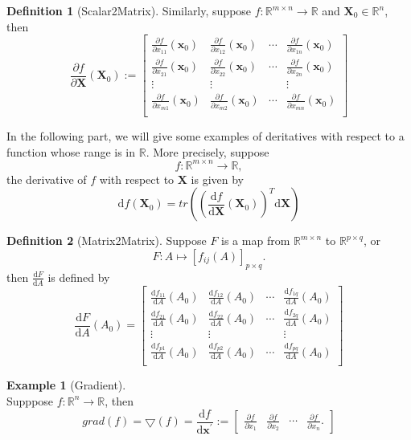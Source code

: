 \documentclass[12pt]{article}
\theoremstyle{definition}
\newtheorem{definition}{Definition}[section]
\newtheorem{example}{Example}[section]
\newcommand{\x}{\mathbf{x}}
\newcommand{\R}{\mathbb{R}}
\newcommand{\X}{\mathbf{X}}
\newcommand{\D}{\mathrm{d}}
\begin{document}
\begin{definition}[Scalar2Matrix]
Similarly, suppose $f:\R^{m \times n} \to \R$ and $\X_0 \in \R^n$, then 
$$
\frac{\partial f}{\partial \X}(\X_0) := \begin{bmatrix}
		\frac{\partial f}{\partial x_{11}}(\x_0) & 	\frac{\partial f}{\partial x_{12}}(\x_0) & \cdots &	\frac{\partial f}{\partial x_{1n}}(\x_0) \\
		\frac{\partial f}{\partial x_{21}}(\x_0) & 	\frac{\partial f}{\partial x_{22}}(\x_0) & \cdots &	\frac{\partial f}{\partial x_{2n}}(\x_0) \\
		\vdots & \vdots &&\vdots  \\
		\frac{\partial f}{\partial x_{m1}}(\x_0) & 	\frac{\partial f}{\partial x_{m2}}(\x_0) & \cdots &	\frac{\partial f}{\partial x_{mn}}(\x_0) \\
\end{bmatrix}
$$

\end{definition}





In the following part, we will give some examples of deritatives with respect to a function whose range is in $\R$. More precisely, suppose
$$
f : \R^{m \times n } \to \R,
$$
the derivative of $f$ with respect to $\X$ is given by
$$
\D f(\X_0)=tr((\frac{\D f}{\D \X}(\X_0))^T\D \X)
$$
\begin{definition}[Matrix2Matrix]
Suppose $F$ is a map from $\R^{m \times n}$ to $\R^{p \times q}$, or
$$
F: A \mapsto [f_{ij}(A)]_{p \times q}.
$$
then $\frac{\D F}{\D A}$ is defined by
$$
\frac{\D F}{\D A}(A_0) = \begin{bmatrix}
\frac{\D f_{11}}{\D A}(A_0) & \frac{\D f_{12}}{\D A}(A_0) & \cdots & \frac{\D f_{1q}}{\D A}(A_0) \\
\frac{\D f_{21}}{\D A}(A_0) & \frac{\D f_{22}}{\D A}(A_0) & \cdots & \frac{\D f_{2q}}{\D A}(A_0) \\
\vdots & \vdots && \vdots \\
\frac{\D f_{p1}}{\D A}(A_0) & \frac{\D f_{p2}}{\D A}(A_0) & \cdots & \frac{\D f_{pq}}{\D A}(A_0) \\
\end{bmatrix}
$$
\end{definition}

\begin{example}[Gradient] \ \\
Supppose $f:\R^n \to \R$, then 
$$
grad(f) = \bigtriangledown(f)=\frac{\D f}{\D \x^\prime} :=\begin{bmatrix}
	\frac{\partial f}{\partial x_1} & \frac{\partial f}{\partial x_2} & \cdots & \frac{\partial f}{\partial x_n}.
\end{bmatrix}
$$
\end{example}
\end{document}

